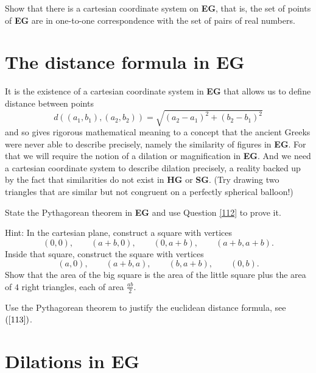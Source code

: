 \documentclass{ximera}
\begin{document}
\begin{question}
Show that there is a cartesian coordinate system on \textbf{EG}, that
is, the set of points of \textbf{EG} are in one-to-one correspondence
with the set of pairs of real numbers.
\end{question}


\section*{The distance formula in \textbf{EG}}

It is the existence of a cartesian coordinate system in \textbf{EG} that
allows us to define distance between points%
\begin{equation}
d\left(  \left(  a_{1},b_{1}\right)  ,\left(  a_{2},b_{2}\right)  \right)
=\sqrt{\left(  a_{2}-a_{1}\right)  ^{2}+\left(  b_{2}-b_{1}\right)  ^{2}}
\label{113}%
\end{equation}
and so gives rigorous mathematical meaning to a concept that the ancient
Greeks were never able to describe precisely, namely the similarity of figures
in \textbf{EG}. For that we will require the notion of a dilation or
magnification in \textbf{EG}. And we need a cartesian coordinate system to
describe dilation precisely, a reality backed up by the fact that similarities
do not exist in \textbf{HG} or \textbf{SG}. (Try drawing two triangles that
are similar but not congruent on a perfectly spherical balloon!)

\begin{question}
State the Pythagorean theorem in \textbf{EG} and use Question
\ref{112} to prove it.

Hint: In the cartesian plane, construct a square with vertices 
\[
\left(0,0\right),\qquad \left(a+b,0\right),\qquad \left(0,a+b\right), \qquad \left( a+b,a+b\right).
\] 
Inside that square, construct the square with vertices 
\[
\left(a,0\right),\qquad \left(a+b,a\right),\qquad \left(b,a+b\right), \qquad \left(0,b\right).
\]
Show that the area of the big square is the area of the little square
plus the area of $4$ right triangles, each of area $\frac{ab}{2}$.
\end{question}

\begin{question}
Use the Pythagorean theorem to justify the euclidean distance formula,
see $\left(\ref{113}\right)$.
\end{question}



\section*{Dilations in \textbf{EG}}
\end{document}
